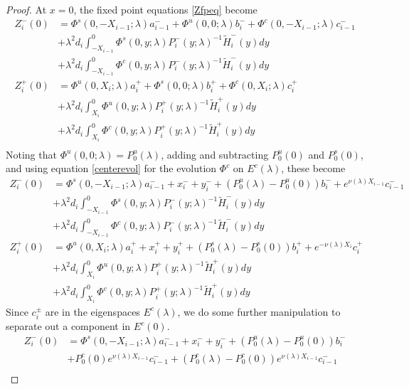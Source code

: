\documentclass[thesis.tex]{subfiles}
\begin{document}
\begin{lemma}
\begin{proof}
At $x = 0$, the fixed point equations \eqref{Zfpeq} become
\begin{align*}
Z_i^-(0) &= \Phi^s(0, -X_{i-1}; \lambda) a_{i-1}^- + \Phi^u(0, 0; \lambda) b_i^- + \Phi^c(0, -X_{i-1}; \lambda) c_{i-1}^- \\
&+ \lambda^2 d_i \int_{-X_{i-1}}^0 \Phi^s(0, y; \lambda) P_i^-(y; \lambda)^{-1} \tilde{H}_i^-(y) dy \\
&+ \lambda^2 d_i \int_{-X_{i-1}}^0 \Phi^c(0, y; \lambda) P_i^-(y; \lambda)^{-1} \tilde{H}_i^-(y) dy  \\ 
Z_i^+(0) &= \Phi^u(0, X_i; \lambda) a_i^+ + \Phi^s(0, 0; \lambda) b_i^+ + \Phi^c(0, X_i; \lambda) c_i^+ \\
&+ \lambda^2 d_i \int_{X_i}^0 \Phi^u(0, y; \lambda) P_i^+(y; \lambda)^{-1} \tilde{H}_i^+(y) dy \\
&+ \lambda^2 d_i \int_{X_i}^0 \Phi^c(0, y; \lambda) P_i^+(y; \lambda)^{-1} \tilde{H}_i^+(y) dy \\
\end{align*}
Noting that $\Phi^u(0, 0; \lambda) = P_0^u(\lambda)$, adding and subtracting $P_0^u(0)$ and $P_0^s(0)$, and using equation \eqref{centerevol} for the evolution $\Phi^c$ on $E^c(\lambda)$, these become
\begin{align*}
Z_i^-(0) &= \Phi^s(0, -X_{i-1}; \lambda) a_{i-1}^- + x_i^- + y_i^- + (P_0^u(\lambda) - P_0^u(0))b_i^- + e^{\nu(\lambda) X_{i-1}} c_{i-1}^- \\
&+ \lambda^2 d_i \int_{-X_{i-1}}^0 \Phi^s(0, y; \lambda) P_i^-(y; \lambda)^{-1} \tilde{H}_i^-(y) dy \\
&+ \lambda^2 d_i \int_{-X_{i-1}}^0 \Phi^c(0, y; \lambda) P_i^-(y; \lambda)^{-1} \tilde{H}_i^-(y) dy  \\ 
Z_i^+(0) &= \Phi^u(0, X_i; \lambda) a_i^+ + x_i^+ + y_i^+ + (P_0^s(\lambda) - P_0^s(0)) b_i^+ + e^{-\nu(\lambda)X_i} c_i^+ \\
&+ \lambda^2 d_i \int_{X_i}^0 \Phi^u(0, y; \lambda) P_i^+(y; \lambda)^{-1} \tilde{H}_i^+(y) dy \\
&+ \lambda^2 d_i \int_{X_i}^0 \Phi^c(0, y; \lambda) P_i^+(y; \lambda)^{-1} \tilde{H}_i^+(y) dy 
\end{align*}
Since $c_i^\pm$ are in the eigenspaces $E^c(\lambda)$, we do some further manipulation to separate out a component in $E^c(0)$.
\begin{align*}
Z_i^-(0) &= \Phi^s(0, -X_{i-1}; \lambda) a_{i-1}^- + x_i^- + y_i^- + (P_0^u(\lambda) - P_0^u(0))b_i^- \\
&+ P_0^c(0) e^{\nu(\lambda) X_{i-1}} c_{i-1}^- + (P_0^c(\lambda) - P_0^c(0)) e^{\nu(\lambda) X_{i-1}} c_{i-1}^- \\

\end{align*}
\end{proof}
\end{lemma}
\end{document}

